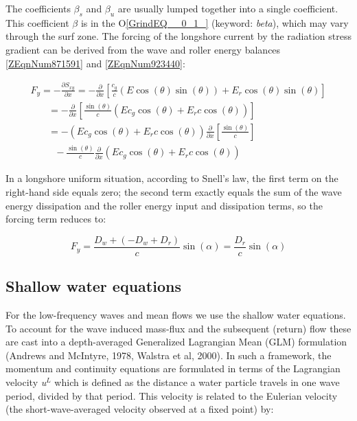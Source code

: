 \documentclass{article}
\begin{document}
\noindent The coefficients $\beta _{s} $ and $\beta _{u} $ are usually lumped together into a single coefficient. This coefficient $\beta $ is in the O\eqref{GrindEQ__0_1_} (keyword: \textit{beta}), which may vary through the surf zone. The forcing of the longshore current by the radiation stress gradient can be derived from the wave and roller energy balances \eqref{ZEqnNum871591} and \eqref{ZEqnNum923440}:

 
\begin{equation} \label{2.46)} 
\begin{array}{l} {F_{y} =-\frac{\partial S_{xy} }{\partial x} =-\frac{\partial }{\partial x} \left[\frac{c_{g} }{c} \left(E\cos \left(\theta \right)\sin \left(\theta \right)\right)+E_{r} \cos \left(\theta \right)\sin \left(\theta \right)\right]} \\ {\, \, \, \, \, \, \, \, \, \, \, =-\frac{\partial }{\partial x} \left[\frac{\sin \left(\theta \right)}{c} \left(Ec_{g} \cos \left(\theta \right)+E_{r} c\cos \left(\theta \right)\right)\right]} \\ {\, \, \, \, \, \, \, \, \, \, \, =-\left(Ec_{g} \cos \left(\theta \right)+E_{r} c\cos \left(\theta \right)\right)\frac{\partial }{\partial x} \left[\frac{\sin \left(\theta \right)}{c} \right]\, \, } \\ {\, \, \, \, \, \, \, \, \, \, \, \, \, \, \, -\frac{\sin \left(\theta \right)}{c} \frac{\partial }{\partial x} \left(Ec_{g} \cos \left(\theta \right)+E_{r} c\cos \left(\theta \right)\right)} \end{array} 
\end{equation} 


\noindent In a longshore uniform situation, according to Snell's law, the first term on the right-hand side equals zero; the second term exactly equals the sum of the wave energy dissipation and the roller energy input and dissipation terms, so the forcing term reduces to:

\noindent 
\begin{equation} \label{ZEqnNum515341} 
F_{y} =\frac{D_{w} +(-D_{w} +D_{r} )}{c} \sin (\alpha )=\frac{D_{r} }{c} \sin (\alpha ) 
\end{equation} 


\subsection{ Shallow water equations}

\noindent For the low-frequency waves and mean flows we use the shallow water equations. To account for the wave induced mass-flux and the subsequent (return) flow these are cast into a depth-averaged Generalized Lagrangian Mean (GLM) formulation (Andrews and McIntyre, 1978, Walstra et al, 2000). In such a framework, the momentum and continuity equations are formulated in terms of the Lagrangian velocity\textit{ u${}^{L}$ }which is defined as the distance a water particle travels in one wave period, divided by that period. This velocity is related to the Eulerian velocity (the short-wave-averaged velocity observed at a fixed point) by:
\end{document}
